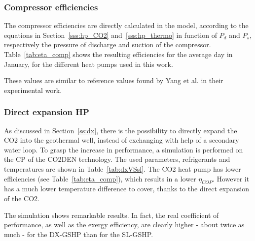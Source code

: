 \documentclass{article}
\begin{document}
\subsubsection{Compressor efficiencies}
The compressor efficiencies are directly calculated in the model, according to the equations in Section~\ref{sss:hp_CO2} and~\ref{sss:hp_thermo} in function of $P_{d}$ and $P_{s}$, respectively the pressure of discharge and suction of the compressor. Table~\ref{tab:eta_comp} shows the resulting efficiencies for the average day in January, for the different heat pumps used in this work.



These values are similar to reference values found by Yang et al.\cite{yangTheoreticalExperimentalInvestigation2016} in their experimental work.




\subsubsection{Direct expansion HP}\label{sss:DX}
As discussed in Section~\ref{ss:dx}, there is the possibility to directly expand the CO2 into the geothermal well, instead of exchanging with help of a secondary water loop. To grasp the increase in performance, a simulation is performed on the CP of the CO2DEN technology. The used parameters, refrigerants and temperatures are shown in Table~\ref{tab:dxVSsl}. The CO2 heat pump has lower efficiencies (see Table~\ref{tab:eta_comp}), which results in a lower $\eta_{COP}$. However it has a much lower temperature difference to cover, thanks to the direct expansion of the CO2.



The simulation shows remarkable results. In fact, the real coefficient of performance, as well as the exergy efficiency, are clearly higher - about twice as much - for the DX-GSHP than for the SL-GSHP. 
\end{document}
